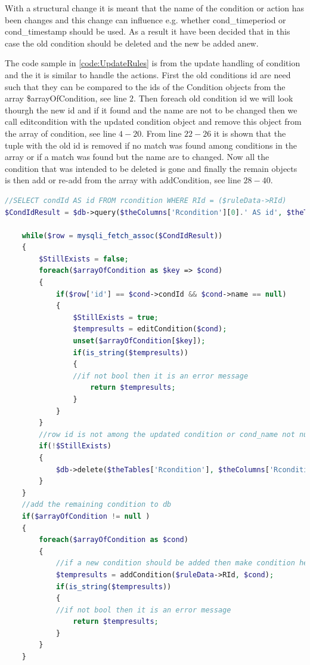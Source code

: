 With a structural change it is meant that the name of the condition or action has been changes and this change can influence e.g. whether cond\_timeperiod or cond\_timestamp should be used. As a result it have been decided that in this case the old condition should be deleted and the new be added anew. 

The code sample in \ref{code:UpdateRules} is from the update handling of condition and the it is similar to handle the actions. First the old conditions id are need such that they can be compared to the ids of the Condition objects from the array \$arrayOfCondition, see line $2$. 
Then foreach old condition id we will look thourgh the new id and if it found and the name are not to be changed then we call editcondition with the updated condition object and remove this object from the array of condition, see line $4-20$. 
From line $22-26$ it is shown that the tuple with the old id is removed if no match was found among conditions in the array or if a match was found but the name are to changed. Now all the condition that was intended to be deleted is gone and finally the remain objects is then add or re-add from the array with addCondition, see line $28-40$.


\begin{lstlisting}[language=PHP, label=code:UpdateRules, caption=editRule code sample]
//SELECT condId AS id FROM rcondition WHERE RId = ($ruleData->RId)
$CondIdResult = $db->query($theColumns['Rcondition'][0].' AS id', $theTables['Rcondition'], $theColumns['Rcondition'][1] . " = " . $ruleData->RId );
				
	while($row = mysqli_fetch_assoc($CondIdResult))
	{
		$StillExists = false;
		foreach($arrayOfCondition as $key => $cond)
		{
			if($row['id'] == $cond->condId && $cond->name == null)				//edit the condition in db
			{
				$StillExists = true;
				$tempresults = editCondition($cond);
				unset($arrayOfCondition[$key]);
				if(is_string($tempresults))
				{
				//if not bool then it is an error message
					return $tempresults;
				}
			}	
		}
		//row id is not among the updated condition or cond_name not null so delete 
		if(!$StillExists)
		{
			$db->delete($theTables['Rcondition'], $theColumns['Rcondition'][0] . " = " .$row['id']);
		}
	}
	//add the remaining condition to db
	if($arrayOfCondition != null )
	{
		foreach($arrayOfCondition as $cond)
		{
			//if a new condition should be added then make condition here
			$tempresults = addCondition($ruleData->RId, $cond);
			if(is_string($tempresults))
			{
			//if not bool then it is an error message
				return $tempresults;
			}
		}
	}
\end{lstlisting}



